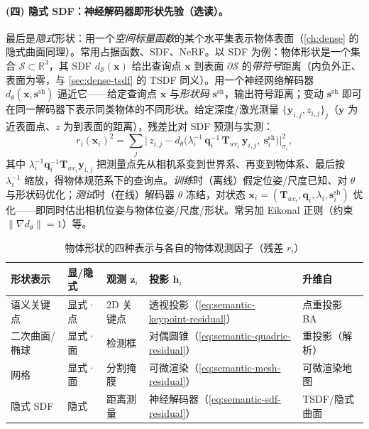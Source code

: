 \paragraph{(四) 隐式 SDF：神经解码器即形状先验（选读）。}
最后是\emph{隐式}形状：用一个\emph{空间标量函数}的某个水平集表示物体表面（\cref{ch:dense} 的隐式曲面同理）。常用占据函数\cite{mescheder2019occupancy}、SDF\cite{park2019deepsdf}、NeRF\cite{mildenhall2020nerf}。以 SDF 为例：物体形状是一个集合 $\mathcal{S}\subset\mathbb{R}^3$，其 SDF $d_{\mathcal{S}}(\mathbf{x})$ 给出查询点 $\mathbf{x}$ 到表面 $\partial\mathcal{S}$ 的\emph{带符号}距离（内负外正、表面为零，与 \cref{sec:dense-tsdf} 的 TSDF 同义）。用一个神经网络解码器 $d_\theta(\mathbf{x},\mathbf{s}^{\mathrm{sh}})$ 逼近它——给定查询点 $\mathbf{x}$ 与\emph{形状码} $\mathbf{s}^{\mathrm{sh}}$，输出符号距离；变动 $\mathbf{s}^{\mathrm{sh}}$ 即可在同一解码器下表示同类物体的不同形状\cite{park2019deepsdf,wang2021ellipsdf}。给定深度/激光测量 $\{\mathbf{y}_{i,j},z_{i,j}\}_j$（$\mathbf{y}$ 为近表面点、$z$ 为到表面的距离），残差比对 SDF 预测与实测：
\begin{equation}
  r_i(\mathbf{x}_i)^2=\sum_j\Big|\,z_{i,j}-d_\theta\big(\lambda_i^{-1}\,\mathbf{q}_i^{-1}\,\mathbf{T}_{wc_i}\,\mathbf{y}_{i,j},\ \mathbf{s}^{\mathrm{sh}}_i\big)\Big|_{\sigma_i}^2,
  \label{eq:semantic-sdf-residual}
\end{equation}
其中 $\lambda_i^{-1}\mathbf{q}_i^{-1}\mathbf{T}_{wc_i}\mathbf{y}_{i,j}$ 把测量点先从相机系变到世界系、再变到物体系、最后按 $\lambda_i^{-1}$ 缩放，得物体规范系下的查询点\cite{ortiz2022isdf}。\emph{训练}时（离线）假定位姿/尺度已知、对 $\theta$ 与形状码优化；\emph{测试}时（在线）解码器 $\theta$ 冻结，对状态 $\mathbf{x}_i=(\mathbf{T}_{wc_i},\mathbf{q}_i,\lambda_i,\mathbf{s}^{\mathrm{sh}}_i)$ 优化——即同时估出相机位姿与物体位姿/尺度/形状。常另加 Eikonal 正则（约束 $\|\nabla d_\theta\|{=}1$）等\cite{gropp2020implicit}。

\begin{table}[H]\centering\small
\caption{物体形状的四种表示与各自的物体观测因子（残差 $r_i$）}
\label{tab:semantic-shape}
\begin{tabular}{p{} p{} p{} p{} p{}}
\toprule
形状表示 & 显/隐式 & 观测 $\mathbf{z}_i$ & 投影 $\mathbf{h}_i$ & 升维自 \\
\midrule
语义关键点 & 显式·点 & 2D 关键点 & 透视投影（\cref{eq:semantic-keypoint-residual}） & 点重投影 BA \\
二次曲面/椭球 & 显式·面 & 检测框 & 对偶圆锥（\cref{eq:semantic-quadric-residual}） & 重投影（解析） \\
网格 & 显式·面 & 分割掩膜 & 可微渲染（\cref{eq:semantic-mesh-residual}） & 可微渲染地图 \\
隐式 SDF & 隐式 & 距离测量 & 神经解码器（\cref{eq:semantic-sdf-residual}） & TSDF/隐式曲面 \\
\bottomrule
\end{tabular}
\end{table}

